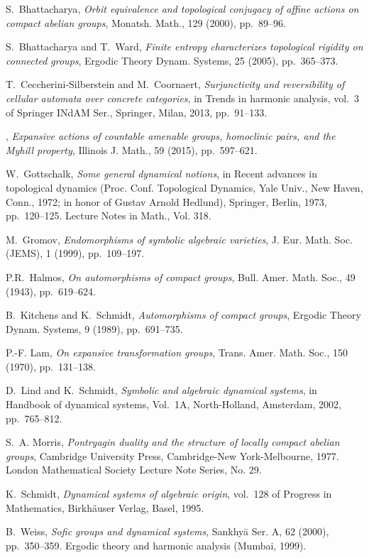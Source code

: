 \documentclass[12pt,a4paper]{amsart}
\theoremstyle{definition}
\numberwithin{equation}{section}
\begin{document}

\begin{thebibliography}{10}

{\sc S.~Bhattacharya}, {\em Orbit equivalence and topological conjugacy of
  affine actions on compact abelian groups}, Monatsh. Math., 129 (2000),
  pp.~89--96.

{\sc S.~Bhattacharya and T.~Ward}, {\em Finite entropy characterizes
  topological rigidity on connected groups}, Ergodic Theory Dynam. Systems, 25
  (2005), pp.~365--373.

{\sc T.~Ceccherini-Silberstein and M.~Coornaert}, {\em Surjunctivity and
  reversibility of cellular automata over concrete categories}, in Trends in
  harmonic analysis, vol.~3 of Springer INdAM Ser., Springer, Milan, 2013,
  pp.~91--133.

\leavevmode\vrule height 2pt depth -1.6pt width 23pt, {\em Expansive actions of
  countable amenable groups, homoclinic pairs, and the {M}yhill property},
  Illinois J. Math., 59 (2015), pp.~597--621.

{\sc W.~Gottschalk}, {\em Some general dynamical notions}, in Recent advances
  in topological dynamics ({P}roc. {C}onf. {T}opological {D}ynamics, {Y}ale
  {U}niv., {N}ew {H}aven, {C}onn., 1972; in honor of {G}ustav {A}rnold
  {H}edlund), Springer, Berlin, 1973, pp.~120--125. Lecture Notes in Math.,
  Vol. 318.

{\sc M.~Gromov}, {\em Endomorphisms of symbolic algebraic varieties}, J. Eur.
  Math. Soc. (JEMS), 1 (1999), pp.~109--197.
	
{\sc P.R.~Halmos}, {\em On automorphisms of compact groups}, Bull. Amer. Math. Soc., 
49 (1943), pp.~619--624.

{\sc B.~Kitchens and K.~Schmidt}, {\em Automorphisms of compact groups},
  Ergodic Theory Dynam. Systems, 9 (1989), pp.~691--735.

{\sc P.-F. Lam}, {\em On expansive transformation groups}, Trans. Amer. Math.
  Soc., 150 (1970), pp.~131--138.

{\sc D.~Lind and K.~Schmidt}, {\em Symbolic and algebraic dynamical systems},
  in Handbook of dynamical systems, {V}ol.\ 1{A}, North-Holland, Amsterdam,
  2002, pp.~765--812.

{\sc S.~A. Morris}, {\em Pontryagin duality and the structure of locally
  compact abelian groups}, Cambridge University Press, Cambridge-New
  York-Melbourne, 1977.
\newblock London Mathematical Society Lecture Note Series, No. 29.

{\sc K.~Schmidt}, {\em Dynamical systems of algebraic origin}, vol.~128 of
  Progress in Mathematics, Birkh\"auser Verlag, Basel, 1995.

{\sc B.~Weiss}, {\em Sofic groups and dynamical systems}, Sankhy\=a Ser. A, 62
  (2000), pp.~350--359.
\newblock Ergodic theory and harmonic analysis (Mumbai, 1999).

\end{thebibliography}
\end{document}
